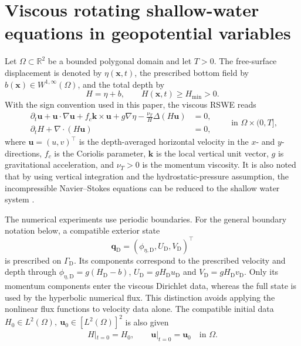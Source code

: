 \documentclass[pdflatex,sn-mathphys-num]{sn-jnl}%
\theoremstyle{thmstyleone}%
\theoremstyle{thmstyletwo}%
\theoremstyle{thmstylethree}%
\begin{document}
\section{Viscous rotating shallow-water equations in geopotential variables}
\label{sec:model}

Let $\Omega\subset\mathbb{R}^2$ be a bounded polygonal domain and let $T>0$. The free-surface displacement is denoted by $\eta(\mathbf{x},t)$, 
the prescribed bottom field by $b(\mathbf{x})\in W^{1,\infty}(\Omega)$, and the total depth by
\[
H=\eta+b,\qquad H(\mathbf{x},t)\ge H_{\min}>0.
\]
With the sign convention used in this paper, the viscous RSWE reads
\begin{equation}
\label{eq1}
\begin{aligned}
\partial_t\mathbf{u}+\mathbf{u}\cdot\nabla\mathbf{u}
+f_c\mathbf{k}\times\mathbf{u}+g\nabla\eta
-\frac{\nu_T}{H}\Delta(H\mathbf{u})&=0,\\
\partial_tH+\nabla\cdot(H\mathbf{u})&=0,
\end{aligned}
\qquad \text{in }\Omega\times(0,T],
\end{equation}
where $\mathbf{u}=(u,v)^\top$ is the depth-averaged horizontal velocity in the $x$- and $y$-directions, $f_c$ is the Coriolis parameter, 
$\mathbf{k}$ is the local vertical unit vector, $g$ is gravitational acceleration, and $\nu_T>0$ is the momentum viscosity.
It is also noted that by using vertical integration and the hydrostatic-pressure assumption, the incompressible Navier--Stokes equations can be reduced to the shallow water system \cite{Aizinger2002}.

The numerical experiments use periodic boundaries. For the general boundary notation below, a compatible exterior state
\[
\mathbf{q}_{\mathrm D}=(\phi_{\eta,\mathrm D},U_{\mathrm D},V_{\mathrm D})^\top
\]
is prescribed on $\Gamma_{\mathrm D}$. Its components correspond to the prescribed velocity and depth through $\phi_{\eta,\mathrm{D}}=g (H_{\mathrm{D}}-b)$, $U_{\mathrm D}=gH_{\mathrm D}u_{\mathrm D}$ and $V_{\mathrm D}=gH_{\mathrm D}v_{\mathrm D}$. Only its momentum components enter the viscous Dirichlet data, whereas the full state is used by the hyperbolic numerical flux. This distinction avoids applying the nonlinear flux functions to velocity data alone.
The compatible initial data $H_0 \in L^2(\Omega),\ \mathbf{u}_0 \in [L^2(\Omega)]^2$ is also given
\begin{equation*}
\begin{aligned}
 H|_{t=0}=H_0,\qquad
\mathbf{u}|_{t=0}=\mathbf{u}_0 \quad \text{in }\Omega.
\end{aligned}
\end{equation*}
\end{document}
